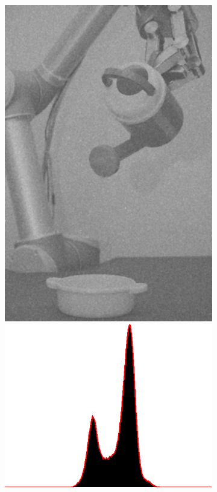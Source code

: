 \begin{figure}[H]
    \centering
    \begin{subfigure}[b]{0.3\textwidth}
        \includegraphics[width=\textwidth]{img2/median.png}\\[0.1cm]
        \includegraphics[width=\textwidth]{img2/histn.png}

\end{subfigure}
\end{figure}
